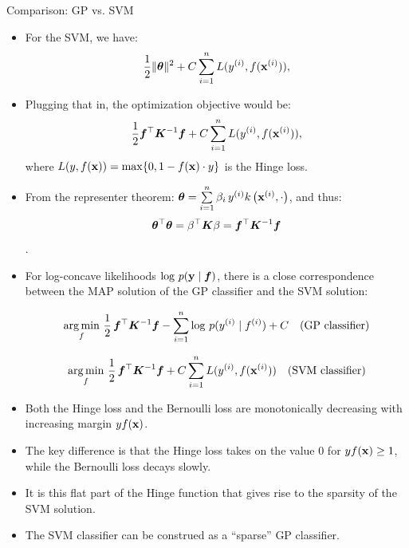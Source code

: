 \begin{frame}[c,allowframebreaks]{Comparison: GP vs. SVM}


\begin{itemize}
\item For the SVM, we have: 
\vspace{-2mm}
$$\frac{1}{2} \|\bm{\theta}\|^2 + C \sum\limits_{i=1}^n L(y^{(i)},f(\mathbf{x}^{(i)})),$$


\vspace{.5cm}
\item Plugging that in, the optimization objective would be:
\vspace{-2mm}
$$\frac{1}{2} \bm{f}^\top \bm{K}^{-1} \bm{f} + C \sum\limits_{i=1}^n L(y^{(i)},f(\mathbf{x}^{(i)})),$$
\vspace{-2mm}
where $L(y,f(\mathbf{x}))  = \max\{0, 1-f(\mathbf{x})\cdot y\}$ is the Hinge loss.


\vspace{1cm}
\item From the representer theorem: $\bm{\theta} = \sum\limits_{i=1}^n \beta_i\,y^{(i)} k\left(\mathbf{x}^{(i)}, \cdot \right)$, and thus:
\vspace{-2mm}
$$\bm{\theta}^\top \bm{\theta} = \beta^\top \bm{K} \beta = \bm{f}^\top \bm{K}^{-1} \bm{f}$$. 

\end{itemize}



\framebreak

\begin{itemize}
\item For log-concave likelihoods $\log\, p(\mathbf{y}\mid \bm{f})$, there is a close correspondence between the MAP solution of the GP classifier and the SVM solution:

\lz

$$\operatorname*{arg\,min}_f\,\frac{1}{2}\,\bm{f}^\top \bm{K}^{-1} \bm{f}- \sum\limits_{i=1}^n \log\, p(y^{(i)}\mid f^{(i)}) + C \quad \text{(GP classifier)}$$

\lz

$$\operatorname*{arg\,min}_f\,\frac{1}{2}\, \bm{f}^\top \bm{K}^{-1} \bm{f} + C \sum\limits_{i=1}^n L(y^{(i)},f(\mathbf{x}^{(i)})) \quad \text{(SVM classifier)}$$
\end{itemize}


\framebreak

\begin{itemize}
\item Both the Hinge loss and the Bernoulli loss are monotonically decreasing with increasing margin $y f(\mathbf{x})$. 
\item The key difference is that the Hinge loss takes on the value $0$ for $y f(\mathbf{x}) \ge 1$, while the Bernoulli loss decays slowly.
\item It is this flat part of the Hinge function that gives rise to the sparsity of the SVM solution. 
\item The SVM classifier can be construed as a ``sparse'' GP classifier.
\end{itemize}


\end{frame}
